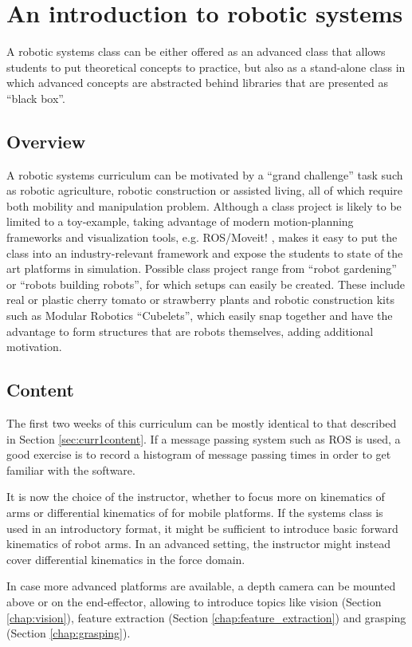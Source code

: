 \section{An introduction to robotic systems}
A robotic systems class can be either offered as an advanced class that allows students to put theoretical concepts to practice, but also as a stand-alone class in which advanced concepts are abstracted behind libraries that are presented as ``black box''.

\subsection{Overview}
A robotic systems curriculum can be motivated by a ``grand challenge'' task such as robotic agriculture, robotic construction or assisted living, all of which require both mobility and manipulation problem. Although a class project is likely to be limited to a toy-example, taking advantage of modern motion-planning frameworks and visualization tools, e.g. ROS/Moveit! \cite{coleman2014reducing}, makes it easy to put the class into an industry-relevant framework and expose the students to state of the art platforms in simulation. Possible class project range from ``robot gardening'' or ``robots building robots'', for which setups can easily be created. These include real or plastic cherry tomato or strawberry plants and robotic construction kits such as Modular Robotics ``Cubelets'', which easily snap together and have the advantage to form structures that are robots themselves, adding additional motivation.

\subsection{Content}
The first two weeks of this curriculum can be mostly identical to that described in Section \ref{sec:curr1content}. If a message passing system such as ROS is used, a good exercise is to record a histogram of message passing times in order to get familiar with the software.

It is now the choice of the instructor, whether to focus more on kinematics of arms or differential kinematics of for mobile platforms. If the systems class is used in an introductory format, it might be sufficient to introduce basic forward kinematics of robot arms. In an advanced setting, the instructor might instead cover differential kinematics in the force domain. 

In case more advanced platforms are available, a depth camera can be mounted above or on the end-effector, allowing to introduce topics like vision (Section \ref{chap:vision}), feature extraction (Section \ref{chap:feature_extraction}) and grasping (Section \ref{chap:grasping}).


